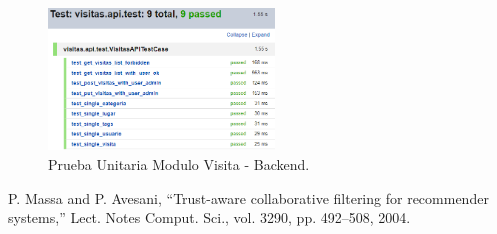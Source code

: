 \documentclass[12pt,letterpaper,openany]{book}
\begin{document}
\begin{figure}[H]
\begin{center}
\includegraphics[width=6cm]{./imagenes/Test/Backend/Test__visitas_api_test}
\caption{Prueba Unitaria Modulo Visita - Backend.}
\end{center}
\end{figure}





\begin{thebibliography}{1}
 P. Massa and P. Avesani, “Trust-aware collaborative filtering for recommender systems,” Lect. Notes Comput. Sci., vol. 3290, pp. 492–508, 2004.
\end{thebibliography}
\end{document}
